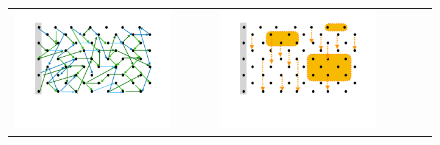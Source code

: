  \begin{figure}[htb]
 \begin{tabular}{clclc}
\begin{minipage}{0.29\textwidth}
 \includegraphics[width=\linewidth, trim=100  120 130 60,clip]{diagrams/neccSuff_yellow_A.pdf}
\end{minipage}
 & \ \ \ & 
\begin{minipage}{0.29\textwidth}
 \includegraphics[width=\linewidth, trim=100  120 130 60,clip]{diagrams/neccSuff_yellow_B.pdf}
\end{minipage}
 & \ \ \ &
\begin{minipage}{0.29\textwidth}

\end{minipage}
\end{tabular}
\end{figure}
